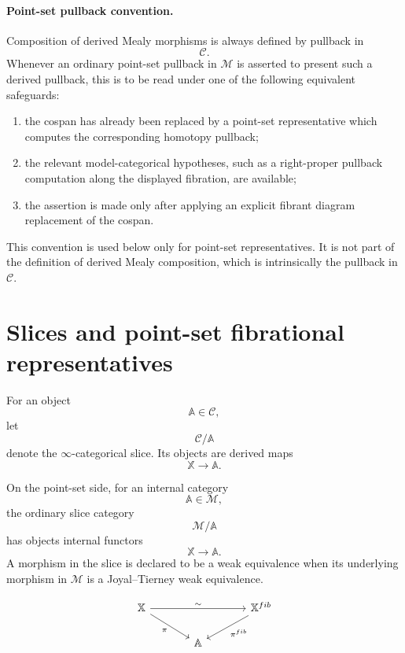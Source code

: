 \paragraph{Point-set pullback convention.}
Composition of derived Mealy morphisms is always defined by pullback in
\[
\mathcal C.
\]
Whenever an ordinary point-set pullback in \(\mathcal M\) is asserted to
present such a derived pullback, this is to be read under one of the
following equivalent safeguards:

\begin{enumerate}
\item the cospan has already been replaced by a point-set representative
which computes the corresponding homotopy pullback;
\item the relevant model-categorical hypotheses, such as a right-proper
pullback computation along the displayed fibration, are available;
\item the assertion is made only after applying an explicit fibrant
diagram replacement of the cospan.
\end{enumerate}

This convention is used below only for point-set representatives. It is
not part of the definition of derived Mealy composition, which is
intrinsically the pullback in \(\mathcal C\).

\section{Slices and point-set fibrational representatives}
\label{sec:slices-point-set-fibrational-representatives}

For an object
\[
\mathbb A\in\mathcal C,
\]
let
\[
\mathcal C/\mathbb A
\]
denote the \(\infty\)-categorical slice. Its objects are derived maps
\[
\mathbb X\to\mathbb A.
\]

On the point-set side, for an internal category
\[
\mathbb A\in\mathcal M,
\]
the ordinary slice category
\[
\mathcal M/\mathbb A
\]
has objects internal functors
\[
\mathbb X\to\mathbb A.
\]
A morphism in the slice is declared to be a weak equivalence when its
underlying morphism in \(\mathcal M\) is a Joyal--Tierney weak
equivalence.

\[
\begin{tikzcd}[column sep=large]
\mathbb X
\arrow[rr, "\sim"]
\arrow[dr, "\pi"']
&
&
\mathbb X^{fib}
\arrow[dl, "\pi^{fib}"]
\\
&
\mathbb A
&
\end{tikzcd}
\]

